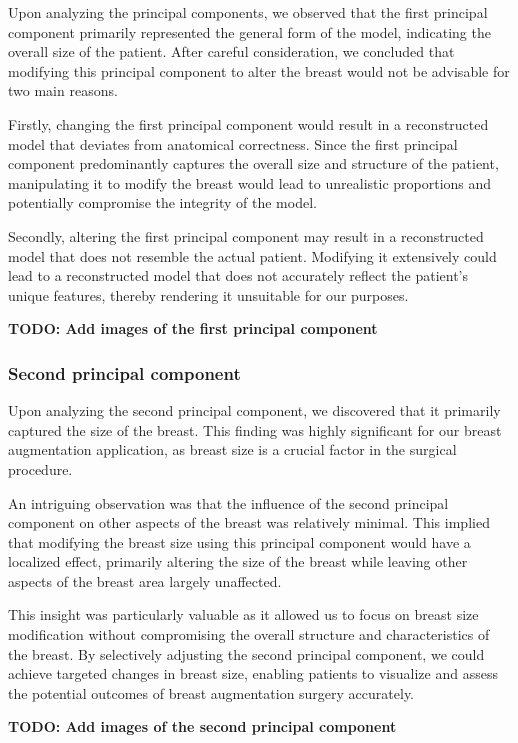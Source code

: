 Upon analyzing the principal components, we observed that the first principal component primarily represented the general form of the model, indicating the overall size of the patient. 
After careful consideration, we concluded that modifying this principal component to alter the breast would not be advisable for two main reasons.

Firstly, changing the first principal component would result in a reconstructed model that deviates from anatomical correctness. Since the first principal component predominantly captures the 
overall size and structure of the patient, manipulating it to modify the breast would lead to unrealistic proportions and potentially compromise the integrity of the model.

Secondly, altering the first principal component may result in a reconstructed model that does not resemble the actual patient. 
Modifying it extensively could lead to a reconstructed model that does not accurately reflect the patient's unique features, thereby rendering it unsuitable for our purposes.

\textbf{TODO: Add images of the first principal component}

\subsubsection{Second principal component}

Upon analyzing the second principal component, we discovered that it primarily captured the size of the breast. This finding was highly significant for our breast augmentation application, 
as breast size is a crucial factor in the surgical procedure.

An intriguing observation was that the influence of the second principal component on other aspects of the breast was relatively minimal. This implied that modifying the breast size 
using this principal component would have a localized effect, primarily altering the size of the breast while leaving other aspects of the breast area largely unaffected.

This insight was particularly valuable as it allowed us to focus on breast size modification without compromising the overall structure and characteristics of the breast. 
By selectively adjusting the second principal component, we could achieve targeted changes in breast size, enabling patients to visualize and assess the potential outcomes of breast augmentation surgery accurately.

\textbf{TODO: Add images of the second principal component}

